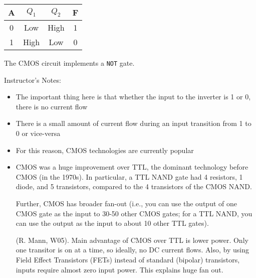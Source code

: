 \ifnum{}
\begin{frame}[fragile]

		\begin{center}
		\begin{tabular}{c|cc|c}
		A & $Q_1$ & $Q_2$ & F\\\hline
		0 & Low & High & 1\\
		1 & High & Low & 0
		\end{tabular}
		\end{center}
  The CMOS circuit implements a \texttt{NOT} gate.

\end{frame}
\BNotes\ifnum{}
\begin{frame}[fragile]
Instructor's Notes:
\begin{itemize}
\item The important thing here is that whether the input to the inverter is 1 or 0, there is no current flow
\item There is a small amount of current flow during an input transition from 1 to 0 or vice-versa
\item For this reason, CMOS technologies are currently popular

\item CMOS was a huge improvement over TTL, the dominant technology before
	CMOS (in the 1970s).  In particular, a TTL NAND
	gate had 4 resistors, 1 diode, and 5 transistors, compared to
	the 4 transistors of the CMOS NAND.  

	Further, CMOS has broader
	fan-out (i.e., you can use the output of one CMOS gate as the
	input to 30-50 other CMOS gates; for a TTL NAND, you can use
	the output as the input to about 10 other TTL gates).

        (R. Mann, W05).  Main advantage of CMOS over TTL is lower power.  Only
        one transitor is on at a time, so ideally, no DC current flows.  Also,
        by using Field Effect Transistors (FETs) instead of standard (bipolar)
        transistors, inputs require almost zero input power.  This explains
        huge fan out.

\end{itemize}
\end{frame}
\fi\ENotes
\fi

